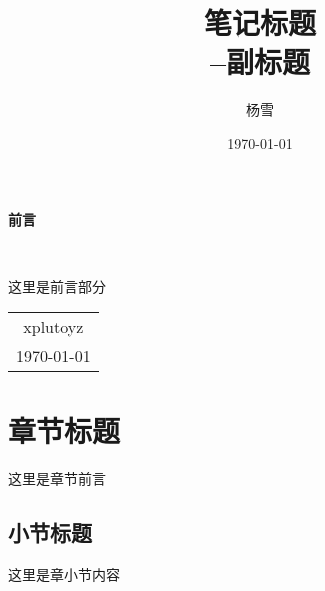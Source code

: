 \documentclass[12pt, a4paper, oneside]{ctexbook}
\title{{\Huge{\textbf{笔记标题}}}\\--副标题}
\author{杨雪}
\date{\today}
\begin{document}
\maketitle

\setcounter{page}{1}

\begin{center}
  \Huge\textbf{前言}
\end{center}~\

这里是前言部分
~\\
\begin{flushright}
  \begin{tabular}{c}
    xplutoyz\\
    \today
  \end{tabular}
\end{flushright}

\newpage
{}
\setcounter{page}{1}
\tableofcontents

\newpage
\setcounter{page}{1}

\chapter{章节标题}

这里是章节前言

\section{小节标题}

这里是章小节内容
\end{document}
